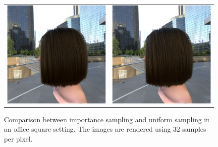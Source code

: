 \documentclass[11pt,a4paper]{report}
\begin{document}
\begin{figure}[h]
\begin{tabular}{cc}
\includegraphics[scale=0.16]{realworld/officesquare/deon_brown2_32.png} &
\includegraphics[scale=0.16]{realworld/officesquare/uniform_brown2_32.png} \\

\end{tabular}
\caption{Comparison between importance sampling and uniform sampling in an office square setting. The images are rendered using 32 samples per pixel.}
\label{fig_officesquare}
\end{figure}
\end{document}
